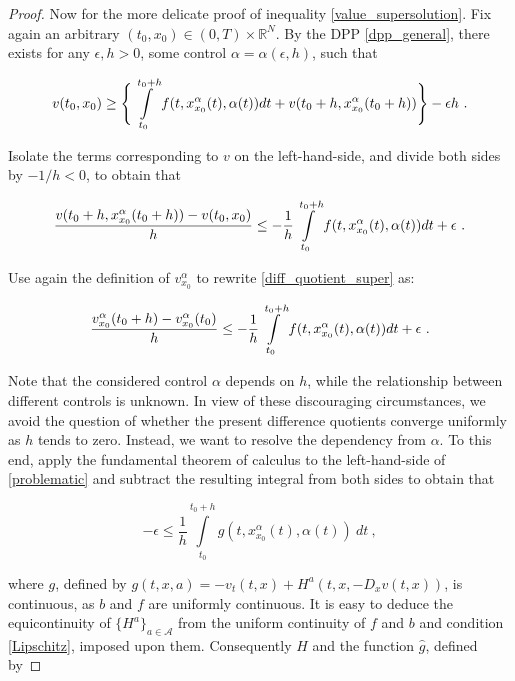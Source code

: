 \begin{theorem}
\begin{proof}
		Now for the more delicate proof of inequality \eqref{value_supersolution}. Fix again an arbitrary $ (t_0, x_0) \in \left( 0 , T \right) \times \mathbb{R}^N $. By the DPP \eqref{dpp_general}, there exists for any $ \epsilon, h > 0 $, some control $ \alpha = \alpha(\epsilon, h) $, such that
		
		\begin{equation*}
			v(t_0, x_0) \geq \Bigg\{ \pathint{\alpha}{t_0}{t_0 + h} + v(t_0 + h, x^{\alpha}_{x_0}(t_0 + h)) \Bigg\} - \epsilon h \ .
		\end{equation*}
		
		Isolate the terms corresponding to $ v $ on the left-hand-side, and divide both sides by $ -1 / h < 0 $, to obtain that
		
		\begin{equation}
			\label{diff_quotient_super}
			\frac{v(t_0 + h, x^{\alpha}_{x_0}(t_0 + h)) - v(t_0, x_0)}{h} \leq - \frac{1}{h} \pathint{\alpha}{t_0}{t_0 + h} + \epsilon \ .
		\end{equation}
		
		Use again the definition of $ v^{\alpha}_{x_0} $ to rewrite \eqref{diff_quotient_super} as:
		
		\begin{equation}
		\label{problematic}
			\frac{v^{\alpha}_{x_0}(t_0 + h) - v^{\alpha}_{x_0}(t_0)}{h} \leq - \frac{1}{h} \pathint{\alpha}{t_0}{t_0 + h} + \epsilon \ .
		\end{equation}
		
		Note that the considered control $ \alpha $ depends on $ h $, while the relationship between different controls is unknown. In view of these discouraging circumstances, we avoid the question of whether the present difference quotients converge uniformly as $ h $ tends to zero. Instead, we want to resolve the dependency from $ \alpha $. To this end, apply the fundamental theorem of calculus to the left-hand-side of \eqref{problematic} and subtract the resulting integral from both sides to obtain that
		
		\begin{equation}
			\label{resolve}
			- \epsilon \leq \frac{1}{h} \int\limits^{t_0 + h}_{t_0} g(t, x^{\alpha}_{x_0}(t), \alpha(t)) \ dt \ ,
		\end{equation}
		
		where $ g $, defined by $ g(t, x, a) = - v_t(t, x) + H^{a}(t, x, -D_x v(t, x)) $, is continuous, as $ b $ and $ f $ are uniformly continuous. It is easy to deduce the equicontinuity of $ \{ H^{a} \}_{a \in \mathcal{A}}  $ from the uniform continuity of $ f $ and $ b $ and condition \eqref{Lipschitz}, imposed upon them. Consequently $ H $ and the function $ \hat{g} $, defined by
		

\end{proof}
\end{theorem}
